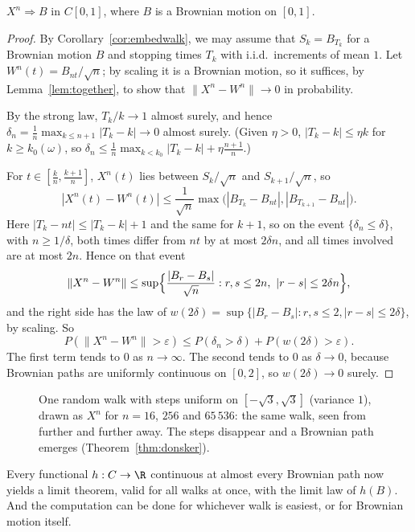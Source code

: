 \begin{theorem}\label{thm:donsker}
$X^n\Rightarrow B$ in $C[0,1]$, where $B$ is a Brownian motion on $[0,1]$.
\end{theorem}
\begin{proof}
By Corollary~\ref{cor:embedwalk}, we may assume that $S_k=B_{T_k}$ for a Brownian motion $B$ and stopping times $T_k$ with i.i.d.\ increments of mean $1$. Let
$W^n(t)=B_{nt}/\sqrt n$; by scaling it is a Brownian motion, so it suffices, by Lemma~\ref{lem:together}, to show that $\|X^n-W^n\|\to0$ in probability.

By the strong law, $T_k/k\to1$ almost surely, and hence $\delta_n=\frac1n\max_{k\le n+1}|T_k-k|\to0$ almost surely. (Given $\eta>0$, $|T_k-k|\le\eta k$ for $k\ge k_0(\omega)$, so
$\delta_n\le\frac1n\max_{k<k_0}|T_k-k|+\eta\frac{n+1}n$.)

For $t\in[\frac kn,\frac{k+1}n]$, $X^n(t)$ lies between $S_k/\sqrt n$ and $S_{k+1}/\sqrt n$, so
\[
|X^n(t)-W^n(t)|\le\frac1{\sqrt n}\max\bigl(|B_{T_k}-B_{nt}|,|B_{T_{k+1}}-B_{nt}|\bigr).
\]
Here $|T_k-nt|\le|T_k-k|+1$ and the same for $k+1$, so on the event $\{\delta_n\le\delta\}$, with $n\ge1/\delta$, both times differ from $nt$ by at most $2\delta n$, and all
times involved are at most $2n$. Hence on that event
\[
\|X^n-W^n\|\le\sup\Bigl\{\frac{|B_r-B_s|}{\sqrt n}:r,s\le2n,\ |r-s|\le2\delta n\Bigr\},
\]
and the right side has the law of $w(2\delta)=\sup\{|B_r-B_s|:r,s\le2,|r-s|\le2\delta\}$, by scaling. So
\[
P(\|X^n-W^n\|>\varepsilon)\le P(\delta_n>\delta)+P(w(2\delta)>\varepsilon).
\]
The first term tends to $0$ as $n\to\infty$. The second tends to $0$ as $\delta\to0$, because Brownian paths are uniformly continuous on $[0,2]$, so $w(2\delta)\to0$ surely.
\end{proof}

\begin{figure}[ht]
\centering{}
\caption{One random walk with steps uniform on $[-\sqrt3,\sqrt3]$ (variance $1$), drawn as $X^n$ for $n=16$, $256$ and $65\,536$: the same walk, seen from further and
further away. The steps disappear and a Brownian path emerges (Theorem~\ref{thm:donsker}).}
\label{fig:donsker}
\end{figure}

Every functional $h:C\to\R$ continuous at almost every Brownian path now yields a limit theorem, valid for all walks at once, with the limit law of $h(B)$. And the
computation can be done for whichever walk is easiest, or for Brownian motion itself.

